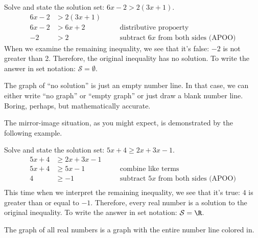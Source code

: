 \begin{boxex}
Solve and state the solution set: $6x-2>2(3x+1)$.
\[\begin{aligned}
6x-2 &> 2(3x+1)
&& \quad\text{}\\
6x-2 &> 6x+2
&& \quad\text{distributive propoerty}\\
-2 &> 2
&& \quad\text{subtract $6x$ from both sides (APOO)}
\end{aligned}\]
When we examine the remaining inequality, we see that it's false: $-2$ is not greater than 2. Therefore, the original inequality has no solution. To write the answer in set notation: $\mathcal{S}=\emptyset$.

The graph of ``no solution'' is just an empty number line. In that case, we can either write ``no graph'' or ``empty graph'' or just draw a blank number line. Boring, perhaps, but mathematically accurate.
\begin{center}
\end{center}
\end{boxex}

The mirror-image situation, as you might expect, is demonstrated by the following example.

\begin{boxex}
Solve and state the solution set: $5x+4 \geq 2x+3x-1$.
\[\begin{aligned}
5x+4 &\geq 2x+3x-1
&& \quad\text{}\\
5x+4 &\geq 5x-1
&& \quad\text{combine like terms}\\
4 &\geq -1
&& \quad\text{subtract $5x$ from both sides (APOO)}\\
\end{aligned}\]
This time when we interpret the remaining inequality, we see that it's true: $4$ is greater than or equal to $-1$. Therefore, every real number is a solution to the original inequality. To write the answer in set notation: $\mathcal{S}=\R$.

The graph of all real numbers is a graph with the entire number line colored in.
\begin{center}
\end{center}
\end{boxex}

